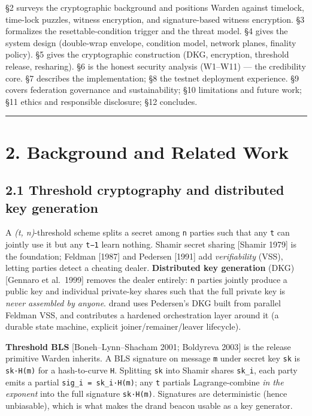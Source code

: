 \documentclass[
  11pt,
]{article}
\begin{document}
§2 surveys the cryptographic background and positions Warden against
timelock, time-lock puzzles, witness encryption, and signature-based
witness encryption. §3 formalizes the resettable-condition trigger and
the threat model. §4 gives the system design (double-wrap envelope,
condition model, network planes, finality policy). §5 gives the
cryptographic construction (DKG, encryption, threshold release,
resharing). §6 is the honest security analysis (W1--W11) --- the
credibility core. §7 describes the implementation; §8 the testnet
deployment experience. §9 covers federation governance and
sustainability; §10 limitations and future work; §11 ethics and
responsible disclosure; §12 concludes.

\begin{center}\rule{0.5\linewidth}{0.5pt}\end{center}

\section{2. Background and Related
Work}\label{background-and-related-work}

\subsection{2.1 Threshold cryptography and distributed key
generation}\label{threshold-cryptography-and-distributed-key-generation}

A \emph{(t, n)}-threshold scheme splits a secret among \texttt{n}
parties such that any \texttt{t} can jointly use it but any \texttt{t−1}
learn nothing. Shamir secret sharing {[}Shamir 1979{]} is the
foundation; Feldman {[}1987{]} and Pedersen {[}1991{]} add
\emph{verifiability} (VSS), letting parties detect a cheating dealer.
\textbf{Distributed key generation} (DKG) {[}Gennaro et al.~1999{]}
removes the dealer entirely: \texttt{n} parties jointly produce a public
key and individual private-key shares such that the full private key is
\emph{never assembled by anyone}. drand uses Pedersen's DKG built from
parallel Feldman VSS, and contributes a hardened orchestration layer
around it (a durable state machine, explicit joiner/remainer/leaver
lifecycle).

\textbf{Threshold BLS} {[}Boneh--Lynn--Shacham 2001; Boldyreva 2003{]}
is the release primitive Warden inherits. A BLS signature on message
\texttt{m} under secret key \texttt{sk} is \texttt{sk·H(m)} for a
hash-to-curve \texttt{H}. Splitting \texttt{sk} into Shamir shares
\texttt{sk\_i}, each party emits a partial
\texttt{sig\_i\ =\ sk\_i·H(m)}; any \texttt{t} partials Lagrange-combine
\emph{in the exponent} into the full signature \texttt{sk·H(m)}.
Signatures are deterministic (hence unbiasable), which is what makes the
drand beacon usable as a key generator.
\end{document}
